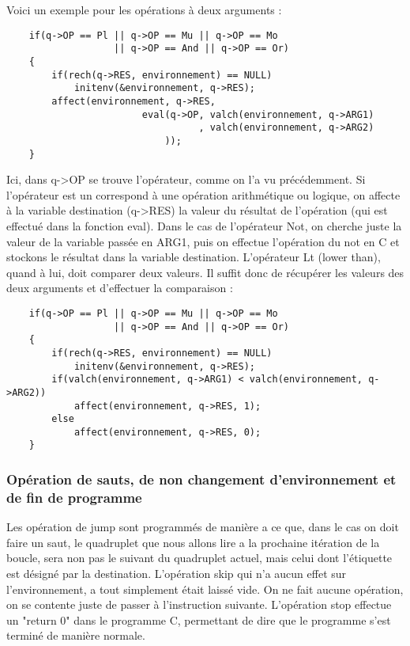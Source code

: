 \documentclass{article}
\begin{document}
Voici un exemple pour les opérations à deux arguments :

\begin{lstlisting}
    if(q->OP == Pl || q->OP == Mu || q->OP == Mo
                   || q->OP == And || q->OP == Or)
    {
        if(rech(q->RES, environnement) == NULL)
            initenv(&environnement, q->RES);
        affect(environnement, q->RES,
                        eval(q->OP, valch(environnement, q->ARG1)
                                  , valch(environnement, q->ARG2)
                            ));
    }
\end{lstlisting}

Ici, dans q->OP se trouve l'opérateur, comme on l'a vu précédemment. Si l'opérateur est un correspond à une opération arithmétique ou logique, on affecte à la variable destination (q->RES) la valeur du résultat de l'opération (qui est effectué dans la fonction eval).
\medbreak
Dans le cas de l'opérateur Not, on cherche juste la valeur de la variable passée en ARG1, puis on effectue l'opération du not en C et stockons le résultat dans la variable destination.
\medbreak
L’opérateur Lt (lower than), quand à lui, doit comparer deux valeurs. Il suffit donc de récupérer les valeurs des deux arguments et d'effectuer la comparaison :

\begin{lstlisting}
    if(q->OP == Pl || q->OP == Mu || q->OP == Mo
                   || q->OP == And || q->OP == Or)
    {
        if(rech(q->RES, environnement) == NULL)
            initenv(&environnement, q->RES);
        if(valch(environnement, q->ARG1) < valch(environnement, q->ARG2))
            affect(environnement, q->RES, 1);
        else
            affect(environnement, q->RES, 0);
    }
\end{lstlisting}


\subsubsection{Opération de sauts, de non changement d'environnement et de fin de programme}

Les opération de jump sont programmés de manière a ce que, dans le cas on doit faire un saut, le quadruplet que nous allons lire a la prochaine itération de la boucle, sera non pas le suivant du quadruplet actuel, mais celui dont l'étiquette est désigné par la destination.
\medbreak
L'opération skip qui n'a aucun effet sur l'environnement, a tout simplement était laissé vide. On ne fait aucune opération, on se contente juste de passer à l'instruction suivante.
\medbreak
L'opération stop effectue un "return 0" dans le programme C, permettant de dire que le programme s'est terminé de manière normale.
\end{document}
